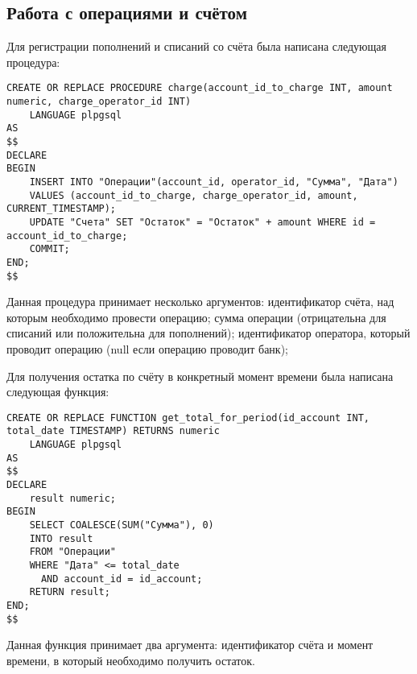 \documentclass[14pt]{extarticle}
\begin{document}
    \newpage
    \subsection{Работа с операциями и счётом}

    Для регистрации пополнений и списаний со счёта была написана следующая процедура:
    \begin{verbatim}
CREATE OR REPLACE PROCEDURE charge(account_id_to_charge INT, amount numeric, charge_operator_id INT)
    LANGUAGE plpgsql
AS
$$
DECLARE
BEGIN
    INSERT INTO "Операции"(account_id, operator_id, "Сумма", "Дата")
    VALUES (account_id_to_charge, charge_operator_id, amount, CURRENT_TIMESTAMP);
    UPDATE "Счета" SET "Остаток" = "Остаток" + amount WHERE id = account_id_to_charge;
    COMMIT;
END;
$$
    \end{verbatim}
    Данная процедура принимает несколько аргументов: идентификатор счёта, над которым необходимо провести операцию; сумма операции (отрицательна для списаний или положительна для пополнений); идентификатор оператора, который проводит операцию (null если операцию проводит банк);

    Для получения остатка по счёту в конкретный момент времени была написана следующая функция:
    \begin{verbatim}
CREATE OR REPLACE FUNCTION get_total_for_period(id_account INT, total_date TIMESTAMP) RETURNS numeric
    LANGUAGE plpgsql
AS
$$
DECLARE
    result numeric;
BEGIN
    SELECT COALESCE(SUM("Сумма"), 0)
    INTO result
    FROM "Операции"
    WHERE "Дата" <= total_date
      AND account_id = id_account;
    RETURN result;
END;
$$
    \end{verbatim}
    Данная функция принимает два аргумента: идентификатор счёта и момент времени, в который необходимо получить остаток.
\end{document}
